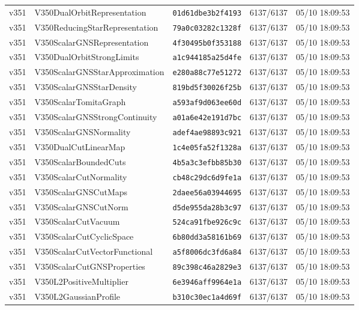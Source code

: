 \documentclass[11pt]{article}
\theoremstyle{definition}\newtheorem{deriv}{Derivação}
\begin{document}
{\begin{longtable}{@{}lllll@{}}
v351 & V350DualOrbitRepresentation & \texttt{01d61dbe3b2f4193} & 6137/6137 & 05/10 18:09:53 \\
v351 & V350ReducingStarRepresentation & \texttt{79a0c03282c1328f} & 6137/6137 & 05/10 18:09:53 \\
v351 & V350ScalarGNSRepresentation & \texttt{4f30495b0f353188} & 6137/6137 & 05/10 18:09:53 \\
v351 & V350DualOrbitStrongLimits & \texttt{a1c944185a25d4fe} & 6137/6137 & 05/10 18:09:53 \\
v351 & V350ScalarGNSStarApproximation & \texttt{e280a88c77e51272} & 6137/6137 & 05/10 18:09:53 \\
v351 & V350ScalarGNSStarDensity & \texttt{819bd5f30026f25b} & 6137/6137 & 05/10 18:09:53 \\
v351 & V350ScalarTomitaGraph & \texttt{a593af9d063ee60d} & 6137/6137 & 05/10 18:09:53 \\
v351 & V350ScalarGNSStrongContinuity & \texttt{a01a6e42e191d7bc} & 6137/6137 & 05/10 18:09:53 \\
v351 & V350ScalarGNSNormality & \texttt{adef4ae98893c921} & 6137/6137 & 05/10 18:09:53 \\
v351 & V350DualCutLinearMap & \texttt{1c4e05fa52f1328a} & 6137/6137 & 05/10 18:09:53 \\
v351 & V350ScalarBoundedCuts & \texttt{4b5a3c3efbb85b30} & 6137/6137 & 05/10 18:09:53 \\
v351 & V350ScalarCutNormality & \texttt{cb48c29dc6d9fe1a} & 6137/6137 & 05/10 18:09:53 \\
v351 & V350ScalarGNSCutMaps & \texttt{2daee56a03944695} & 6137/6137 & 05/10 18:09:53 \\
v351 & V350ScalarGNSCutNorm & \texttt{d5de955da28b3c97} & 6137/6137 & 05/10 18:09:53 \\
v351 & V350ScalarCutVacuum & \texttt{524ca91fbe926c9c} & 6137/6137 & 05/10 18:09:53 \\
v351 & V350ScalarCutCyclicSpace & \texttt{6b80dd3a58161b69} & 6137/6137 & 05/10 18:09:53 \\
v351 & V350ScalarCutVectorFunctional & \texttt{a5f8006dc3fd6a84} & 6137/6137 & 05/10 18:09:53 \\
v351 & V350ScalarCutGNSProperties & \texttt{89c398c46a2829e3} & 6137/6137 & 05/10 18:09:53 \\
v351 & V350L2PositiveMultiplier & \texttt{6e3946aff9964e1a} & 6137/6137 & 05/10 18:09:53 \\
v351 & V350L2GaussianProfile & \texttt{b310c30ec1a4d69f} & 6137/6137 & 05/10 18:09:53 \\

\end{longtable}}
\end{document}
